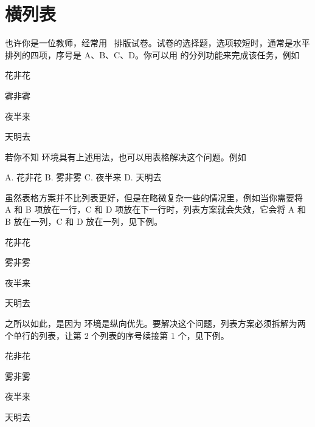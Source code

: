 
\startTEX
{}
\stopTEX

\section{横列表}

也许你是一位教师，经常用 \CONTEXT\ 排版试卷。试卷的选择题，选项较短时，通常是水平排列的四项，序号是 A、B、C、D。你可以用  的分列功能来完成该任务，例如

\startexample
{}
\item 花非花 \item 雾非雾 \item 夜半来 \item 天明去
\stopitemize
\stopexample
\simpleexample[option=TEX]{\null}
\getexample

若你不知  环境具有上述用法，也可以用表格解决这个问题。例如

\startexample
\starttabulate[|p|p|p|p|]
\NC A. 花非花 \NC B. 雾非雾 \NC C. 夜半来 \NC D. 天明去 \NC\NR
\stoptabulate
\stopexample
\simpleexample[option=TEX]{\null}

\noindent 虽然表格方案并不比列表更好，但是在略微复杂一些的情况里，例如当你需要将 A 和 B 项放在一行，C 和 D 项放在下一行时，列表方案就会失效，它会将 A 和 B 放在一列，C 和 D 放在一列，见下例。

\startexample
{}
\item 花非花 \item 雾非雾 \item 夜半来 \item 天明去
\stopitemize
\stopexample
\simpleexample[option=TEX]{\null}
\getexample
\blank[halfline]

\noindent 之所以如此，是因为  环境是纵向优先。要解决这个问题，列表方案必须拆解为两个单行的列表，让第 2 个列表的序号续接第 1 个，见下例。

\startexample
{}
\item 花非花 \item 雾非雾
\stopitemize
{}  
\item 夜半来 \item 天明去
\stopitemize
\stopexample
\simpleexample[option=TEX]{\null}
\getexample
\blank[halfline]

